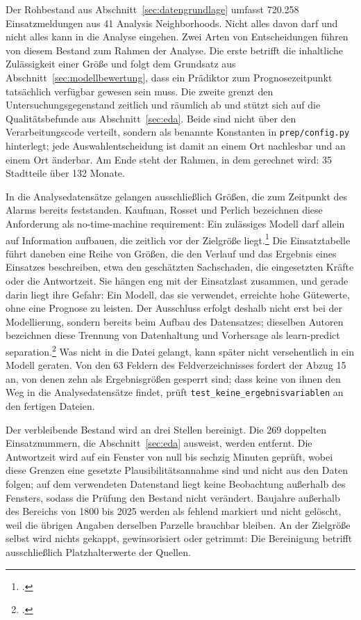 Der Rohbestand aus Abschnitt~\ref{sec:datengrundlage} umfasst 720.258
Einsatzmeldungen aus 41 Analysis Neighborhoods. Nicht alles davon darf und
nicht alles kann in die Analyse eingehen. Zwei Arten von Entscheidungen führen
von diesem Bestand zum Rahmen der Analyse. Die erste betrifft die inhaltliche
Zulässigkeit einer Größe und folgt dem Grundsatz aus
Abschnitt~\ref{sec:modellbewertung}, dass ein Prädiktor zum Prognosezeitpunkt
tatsächlich verfügbar gewesen sein muss. Die zweite grenzt den
Untersuchungsgegenstand zeitlich und räumlich ab und stützt sich auf die
Qualitätsbefunde aus Abschnitt~\ref{sec:eda}. Beide sind nicht über den
Verarbeitungscode verteilt, sondern als benannte Konstanten in
\texttt{prep/config.py} hinterlegt; jede Auswahlentscheidung ist damit an einem
Ort nachlesbar und an einem Ort änderbar. Am Ende steht der Rahmen, in dem
gerechnet wird: 35 Stadtteile über 132 Monate.

In die Analysedatensätze gelangen ausschließlich Größen, die zum Zeitpunkt des
Alarms bereits feststanden. Kaufman, Rosset und Perlich bezeichnen diese
Anforderung als no-time-machine requirement: Ein zulässiges Modell darf allein
auf Information aufbauen, die zeitlich vor der Zielgröße
liegt.\footcite[559]{Kaufman2011} Die Einsatztabelle führt daneben eine Reihe
von Größen, die den Verlauf und das Ergebnis eines Einsatzes beschreiben, etwa
den geschätzten Sachschaden, die eingesetzten Kräfte oder die Antwortzeit. Sie
hängen eng mit der Einsatzlast zusammen, und gerade darin liegt ihre Gefahr:
Ein Modell, das sie verwendet, erreichte hohe Gütewerte, ohne eine Prognose zu
leisten. Der Ausschluss erfolgt deshalb nicht erst bei der Modellierung,
sondern bereits beim Aufbau des Datensatzes; dieselben Autoren bezeichnen diese
Trennung von Datenhaltung und Vorhersage als learn-predict
separation.\footcite[560]{Kaufman2011} Was nicht in die Datei gelangt, kann
später nicht versehentlich in ein Modell geraten. Von den 63 Feldern des
Feldverzeichnisses fordert der Abzug 15 an, von denen zehn als Ergebnisgrößen
gesperrt sind; dass keine von ihnen den Weg in die Analysedatensätze findet,
prüft \texttt{test\_keine\_ergebnisvariablen} an den fertigen Dateien.

Der verbleibende Bestand wird an drei Stellen bereinigt. Die 269 doppelten
Einsatznummern, die Abschnitt~\ref{sec:eda} ausweist, werden entfernt. Die
Antwortzeit wird auf ein Fenster von null bis
sechzig Minuten geprüft, wobei diese Grenzen eine gesetzte
Plausibilitätsannahme sind und nicht aus den Daten folgen; auf dem verwendeten
Datenstand liegt keine Beobachtung außerhalb des Fensters, sodass die Prüfung
den Bestand nicht verändert. Baujahre außerhalb des Bereichs von 1800 bis 2025
werden als fehlend markiert und nicht gelöscht, weil die übrigen Angaben
derselben Parzelle brauchbar bleiben. An der Zielgröße selbst wird nichts
gekappt, gewinsorisiert oder getrimmt: Die Bereinigung betrifft ausschließlich
Platzhalterwerte der Quellen.

